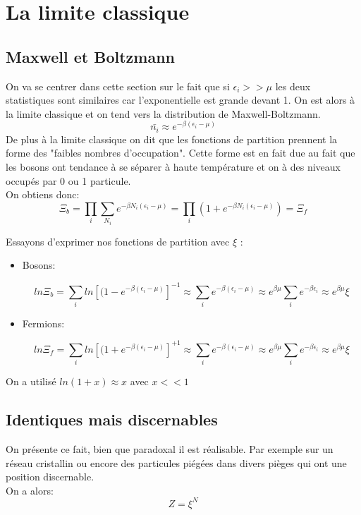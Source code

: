\section{La limite classique}


\subsection{Maxwell et Boltzmann}

On va se centrer dans cette section sur le fait que si $\epsilon_i>>\mu$ les deux statistiques sont similaires car l'exponentielle est grande devant 1. On est alors à la limite classique et on tend vers la distribution de Maxwell-Boltzmann.
$$\bar{n_i}\approx e^{-\beta(\epsilon_i-\mu)}$$
De plus à la limite classique on dit que les fonctions de partition prennent la forme des "faibles nombres d'occupation". Cette forme est en fait due au fait que les bosons ont tendance à se séparer à haute température et on à des niveaux occupés par 0 ou 1 particule.\\ On obtiens donc:
$$\Xi_b=\prod_i\sum_{N_i}e^{-\beta N_i (\epsilon_i-\mu)}=\prod_i\left(1+e^{-\beta N_i (\epsilon_i-\mu)}\right)=\Xi_f$$


Essayons d'exprimer nos fonctions de partition avec $\xi$ :

\begin{itemize}[label=]

	\item Bosons:

	$$ln\Xi_{b}=\sum_i ln\left[(1-e^{-\beta  (\epsilon_i-\mu)}\right]^{-1}\approx \sum_i e^{-\beta (\epsilon_i-\mu)}\approx e^{\beta \mu}\sum_ie^{-\beta\epsilon_i}\approx e^{\beta \mu}\xi$$

	\item Fermions:

	$$ln\Xi_{f}=\sum_i ln\left[(1+e^{-\beta  (\epsilon_i-\mu)}\right]^{+1}\approx \sum_i e^{-\beta (\epsilon_i-\mu)}\approx e^{\beta \mu}\sum_ie^{-\beta\epsilon_i}\approx e^{\beta \mu}\xi$$

\end{itemize}

On a utilisé $ln(1+x)\approx x $ avec $x<<1$

\subsection{Identiques mais discernables}

On présente ce fait, bien que paradoxal il est réalisable. Par exemple sur un réseau cristallin ou encore des particules piégées dans divers pièges qui ont une position discernable.\\ 
On a alors:
$$Z=\xi^N$$

